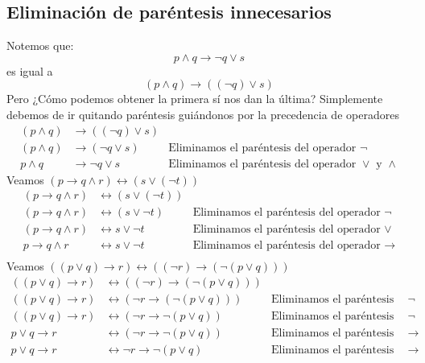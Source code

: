 \documentclass[a4paper]{article}
\begin{document}
\subsection{Eliminación de paréntesis innecesarios}
\noindent
Notemos que:
\[
     p \land q \rightarrow \neg q \lor s  
\]
es igual a
\[
    \left(p \land q\right) \rightarrow \left(\left(\neg q \right) \lor s\right)  
\]
Pero ¿Cómo podemos obtener la primera sí nos dan la última?
\newline 
Simplemente debemos de ir quitando paréntesis guiándonos por la precedencia de operadores
\begin{align*}
    \left(p \land q\right) &\rightarrow \left(\left(\neg q \right) \lor s\right) &\\
    \left(p \land q\right) &\rightarrow \left(\neg q \lor s\right) &\text{Eliminamos el paréntesis del operador \(\neg\)}\\
    p \land q &\rightarrow \neg q \lor s &\text{Eliminamos el paréntesis del operador \(\lor\) y \(\land\)}
\end{align*}
Veamos \(\left(p \rightarrow q \land r\right) \leftrightarrow \left(s \lor \left(\neg t\right)\right)\)
\begin{align*}
    \left(p \rightarrow q \land r\right) &\leftrightarrow \left(s \lor \left(\neg t\right)\right) &\\
    \left(p \rightarrow q \land r\right) &\leftrightarrow \left(s \lor \neg t\right) &\text{Eliminamos el paréntesis del operador \(\neg\)}\\
    \left(p \rightarrow q \land r\right) &\leftrightarrow s \lor \neg t &\text{Eliminamos el paréntesis del operador \(\lor\)}\\
    p \rightarrow q \land r &\leftrightarrow s \lor \neg t &\text{Eliminamos el paréntesis del operador \(\rightarrow\)}\\
\end{align*}
Veamos \(\left(\left(p \lor q\right) \rightarrow r\right) \leftrightarrow \left(\left(\neg r\right) \rightarrow \left(\neg\left(p \lor q\right)\right) \right)\)
\begin{align*}
    \left(\left(p \lor q\right) \rightarrow r\right) &\leftrightarrow \left(\left(\neg r\right) \rightarrow \left(\neg\left(p \lor q\right)\right) \right) & \\
    \left(\left(p \lor q\right) \rightarrow r\right) &\leftrightarrow \left(\neg r \rightarrow \left(\neg\left(p \lor q\right)\right) \right) & \text{Eliminamos el paréntesis del operador \(\neg\)} \\
    \left(\left(p \lor q\right) \rightarrow r\right) &\leftrightarrow \left(\neg r \rightarrow \neg\left(p \lor q\right) \right) & \text{Eliminamos el paréntesis del operador \(\neg\)} \\
    p \lor q \rightarrow r &\leftrightarrow \left(\neg r \rightarrow \neg\left(p \lor q\right) \right) & \text{Eliminamos el paréntesis del operador \(\rightarrow\)} \\
    p \lor q \rightarrow r &\leftrightarrow \neg r \rightarrow \neg\left(p \lor q\right) & \text{Eliminamos el paréntesis del operador \(\rightarrow\)}
\end{align*}
\end{document}
